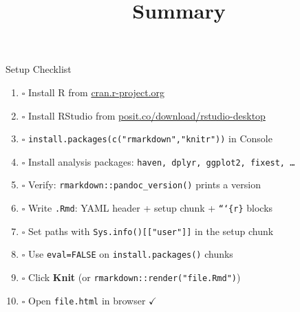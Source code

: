 \documentclass[dvipsnames,hyperref={pdfpagelabels=false}]{beamer}
\begin{document}
\title[]{Summary}
\author{}\institute{}\date{}
\begin{frame}{}
  \titlepage
\end{frame}

\begin{frame}{Setup Checklist}
  \begin{enumerate}
    \item $\square$ Install R from \url{cran.r-project.org}
    \item $\square$ Install RStudio from \url{posit.co/download/rstudio-desktop}
    \item $\square$ \texttt{install.packages(c("rmarkdown","knitr"))} in Console
    \item $\square$ Install analysis packages: \texttt{haven, dplyr, ggplot2, fixest, \ldots}
    \item $\square$ Verify: \texttt{rmarkdown::pandoc\_version()} prints a version
    \item $\square$ Write \texttt{.Rmd}: YAML header + setup chunk + \texttt{```\{r\}} blocks
    \item $\square$ Set paths with \texttt{Sys.info()[["user"]]} in the setup chunk
    \item $\square$ Use \texttt{eval=FALSE} on \texttt{install.packages()} chunks
    \item $\square$ Click \textbf{Knit} (or \texttt{rmarkdown::render("file.Rmd")})
    \item $\square$ Open \texttt{file.html} in browser $\checkmark$
  \end{enumerate}
\end{frame}
\end{document}
